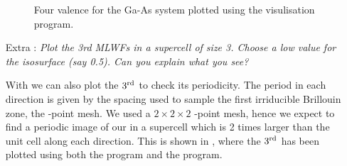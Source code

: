 \begin{enumerate}
\begin{figure}[h!]
\centering
{}
\centering
{}
\centering
{}
\centering
{}
\caption{Four valence \MLWFs{} for the Ga-As system plotted using the \xcrysden{} visulisation program.}\label{fig1.2}
\end{figure}

\item[Extra :] {\it Plot the 3rd MLWFs in a supercell of size 3. Choose a low value for the isosurface (say 0.5). Can
you explain what you see?}

With \xcrysden{} we can also plot the $3\tinysup{rd}$ \MLWF{} to check its periodicity. The period in each direction is given by the spacing used to sample the first irriducible Brillouin zone, \ie{} the \bfk-point mesh. We used a $2\times2\times2$ \bfk-point mesh, hence we expect to find a periodic image of our \MLWF{} in a supercell which is 2 times larger than the unit cell along each direction. This is shown in , where the $3\tinysup{rd}$ has been plotted using both the \xcrysden{} program and the \vesta{} program.   
\end{enumerate}

